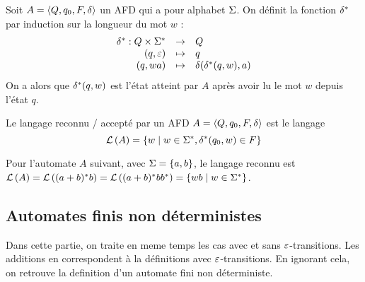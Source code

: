 \begin{definition}
	Soit $A = \langle Q, q_0, F, \delta \rangle$ un AFD qui a pour alphabet $\Sigma$. On définit la fonction $\delta^{*}$ par induction sur la longueur du mot $w$ :
	$$ \begin{array}{rcl}
			\delta^{*} : Q \times \Sigma^{*} & \to     & Q                               \\
			(q, \varepsilon)                   & \mapsto & q                               \\
			(q, wa)                         & \mapsto & \delta(\delta^{*}(q, w), a)
		\end{array} $$
	On a alors que $\delta^{*}(q, w)$ est l'état atteint par $A$ après avoir lu le mot $w$ depuis l'état $q$.
\end{definition}

\begin{definition}
	Le langage reconnu / accepté par un AFD $A = \langle Q, q_0, F, \delta \rangle$ est le langage
	$$ \mathcal{L}\left(A\right) = \left\{w \mid w \in \Sigma^{*}, \delta^{*}(q_0, w) \in F\right\} $$
\end{definition}

\begin{exemple}
	Pour l'automate $A$ suivant, avec $\Sigma = \left\{a,b\right\}$, le langage reconnu est $\mathcal{L}\left(A\right) = \mathcal{L}\left((a + b)^{*} b\right) = \mathcal{L}\left((a + b)^{*} b b^{*}\right) = \left\{wb \mid w \in \Sigma^{*}\right\}$.

	\begin{center}
		\begin{automata}
		\end{automata}
	\end{center}
\end{exemple}

\subsection{Automates finis non déterministes }

Dans cette partie, on traite en meme temps les cas avec et sans $\varepsilon$-transitions. Les additions en
 correspondent à la définitions avec $\varepsilon$-transitions. En ignorant cela, on retrouve la
definition d'un automate fini non déterministe.

